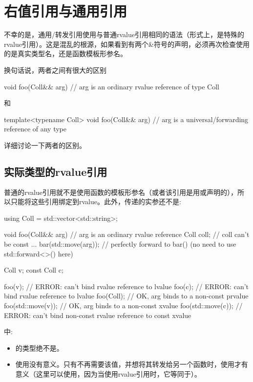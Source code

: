 \section{右值引用与通用引用}
不幸的是，通用/转发引用使用与普通rvalue引用相同的语法（形式上，是特殊的rvalue引用）。这是混乱的根源，如果看到有两个\&符号的声明，必须再次检查使用的是真实类型名，还是函数模板形参名。

换句话说，两者之间有很大的区别

\begin{cppcode}
void foo(Coll&& arg) // arg is an ordinary rvalue reference of type Coll
\end{cppcode}

和

\begin{cppcode}
template<typename Coll>
void foo(Coll&& arg) // arg is a universal/forwarding reference of any type
\end{cppcode}

详细讨论一下两者的区别。

\subsection{实际类型的rvalue引用}

普通的rvalue引用就不是使用函数的模板形参名（或者该引用是用或声明的），所以只能将这些引用绑定到rvalue。此外，传递的实参还不是:

\begin{cppcode}
using Coll = std::vector<std::string>;

void foo(Coll&& arg) // arg is an ordinary rvalue reference
{
	Coll coll; // coll can’t be const
	...
	bar(std::move(arg)); // perfectly forward to bar() (no need to use std::forward<>() here)
}

Coll v;
const Coll c;

foo(v); // ERROR: can’t bind rvalue reference to lvalue
foo(c); // ERROR: can’t bind rvalue reference to lvalue
foo(Coll{}); // OK, arg binds to a non-const prvalue
foo(std::move(v)); // OK, arg binds to a non-const xvalue
foo(std::move(c)); // ERROR: can’t bind non-const rvalue reference to const xvalue
\end{cppcode}

中:

\begin{itemize}
	\item {}的类型绝不是。
	\item 使用没有意义。只有不再需要该值，并想将其转发给另一个函数时，使用才有意义（这里可以使用，因为当使用rvalue引用时，它等同于）。
\end{itemize}

